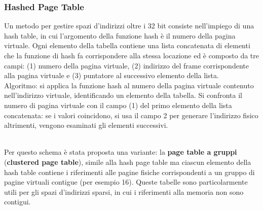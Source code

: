 \documentclass{article}
\begin{document}
			\subsubsection{Hashed Page Table}
				Un metodo per gestire spazi d’indirizzi oltre i 32 bit consiste nell’impiego di una hash table, in cui l’argomento della funzione hash è il numero della pagina virtuale. Ogni elemento della tabella contiene una lista concatenata di elementi che la funzione di hash fa corrispondere alla stessa locazione ed è composto da tre campi: (1) numero della pagina virtuale, (2) indirizzo del frame corrispondente alla pagina virtuale e (3) puntatore al successivo elemento della lista.
				\\Algoritmo: si applica la funzione hash al numero della pagina virtuale contenuto nell’indirizzo virtuale, identificando un elemento della tabella. Si confronta il numero di pagina virtuale con il campo (1) del primo elemento della lista concatenata: se i valori coincidono, si usa il campo 2 per generare l’indirizzo fisico altrimenti, vengono esaminati gli elementi successivi.
				\begin{figure}[ht!]
				\end{figure}
				\\Per questo schema è stata proposta una variante: la \textbf{page table a gruppi} (\textbf{clustered page table}), simile alla hash page table ma ciascun elemento della hash table contiene i riferimenti alle pagine fisiche corrispondenti a un gruppo di pagine virtuali contigue (per esempio 16). Queste tabelle sono particolarmente utili per gli spazi d’indirizzi sparsi, in cui i riferimenti alla memoria non sono contigui.
\end{document}
